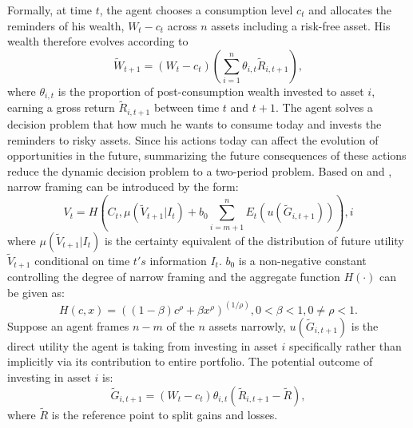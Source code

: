 \documentclass[ukenglish,nottitlepage,thmsb,11pt,letterpaper]{article}
\begin{document}
Formally, at time $t$, the agent chooses a consumption level $c_{t}$ and allocates the reminders of his wealth, $W_t - c_t$ across $n$ assets including a risk-free asset. His wealth therefore evolves according to
\begin{equation}
\widetilde{W}_{t+1} = (W_t-c_t)\left( \sum_{i=1}^{n} \theta_{i,t} \widetilde{R}_{i,t+1}  \right),
\end{equation}            
where $\theta_{i,t}$ is the proportion of post-consumption wealth invested to asset $i$, earning a gross return $\widetilde{R}_{i, t+1}$ between time $t$ and $t+1$.  The agent solves a decision problem that how much he wants to consume today and invests the reminders to risky assets. Since his actions today can affect the evolution of opportunities in the future, summarizing the future consequences of these actions reduce the dynamic decision problem to a two-period problem. Based on \citet{Barberis2006} and \citet{Barberis2009}, narrow framing can be introduced by the form:
\begin{equation}
V_t = H \left( C_t, \mu(\widetilde{V}_{t+1}\vert{I_t}) + b_0 \sum_{i = m+1}^{n}E_t ( u(\widetilde{G}_{i,t+1}) ) \right),i
\end{equation}
where $\mu(\widetilde{V}_{t+1}\vert{I_t})$ is the certainty equivalent of the distribution of future utility $\widetilde{V}_{t+1}$ conditional on time $t's$ information $I_t$. $b_0$ is a non-negative constant controlling the degree of narrow framing and the aggregate function $H(\cdot)$ can be given as:
\begin{equation}
H(c,x) = \left( (1-\beta)c^\rho + \beta x^\rho \right)^ {(1/\rho)}, 0<\beta<1, 0\neq\rho<1.
\end{equation}
Suppose an agent frames $n-m$ of the $n$ assets narrowly, $u(\widetilde{G}_{i,t+1})$ is the direct utility the agent is taking from investing in asset $i$ specifically rather than implicitly via its contribution to entire portfolio. The potential outcome of investing in asset $i$ is:  \begin{equation}
\widetilde{G}_{i,t+1} = (W_t - c_t) \theta_{i,t} \left( \widetilde{R}_{i,t+1}-\widetilde{R} \right),
\end{equation}
where $\widetilde{R}$ is the reference point to split gains and losses. 
\end{document}
